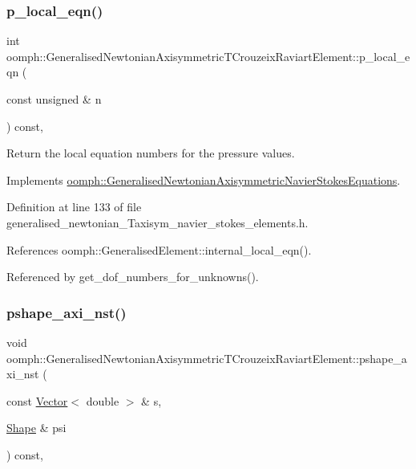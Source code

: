 \subsubsection{\texorpdfstring{p\+\_\+local\+\_\+eqn()}{p\_local\_eqn()}}
{\footnotesize\ttfamily int oomph\+::\+Generalised\+Newtonian\+Axisymmetric\+T\+Crouzeix\+Raviart\+Element\+::p\+\_\+local\+\_\+eqn (\begin{DoxyParamCaption}\item[{const unsigned \&}]{n }\end{DoxyParamCaption}) const\hspace{0.3cm}{\ttfamily [inline]}, {\ttfamily [virtual]}}



Return the local equation numbers for the pressure values. 



Implements \hyperlink{classoomph_1_1GeneralisedNewtonianAxisymmetricNavierStokesEquations_a1432210bfed0cd920d1fb1c4d9e73d3f}{oomph\+::\+Generalised\+Newtonian\+Axisymmetric\+Navier\+Stokes\+Equations}.



Definition at line 133 of file generalised\+\_\+newtonian\+\_\+\+Taxisym\+\_\+navier\+\_\+stokes\+\_\+elements.\+h.



References oomph\+::\+Generalised\+Element\+::internal\+\_\+local\+\_\+eqn().



Referenced by get\+\_\+dof\+\_\+numbers\+\_\+for\+\_\+unknowns().

\mbox{\label{classoomph_1_1GeneralisedNewtonianAxisymmetricTCrouzeixRaviartElement_a1b9ec235ffab0005d4f38fe0fc639491}} 
\subsubsection{\texorpdfstring{pshape\+\_\+axi\+\_\+nst()}{pshape\_axi\_nst()}\hspace{0.1cm}{\footnotesize\ttfamily [1/2]}}
{\footnotesize\ttfamily void oomph\+::\+Generalised\+Newtonian\+Axisymmetric\+T\+Crouzeix\+Raviart\+Element\+::pshape\+\_\+axi\+\_\+nst (\begin{DoxyParamCaption}\item[{const \hyperlink{classoomph_1_1Vector}{Vector}$<$ double $>$ \&}]{s,  }\item[{\hyperlink{classoomph_1_1Shape}{Shape} \&}]{psi }\end{DoxyParamCaption}) const\hspace{0.3cm}{\ttfamily [inline]}, {\ttfamily [virtual]}}



